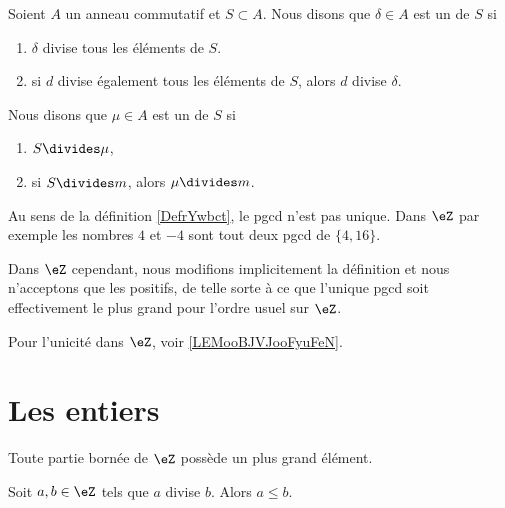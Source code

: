 \begin{definition}\label{DefrYwbct}
    Soient \( A\) un anneau commutatif et \( S\subset A\). Nous disons que \( \delta\in A\) est un  de \( S\) si
    \begin{enumerate}
        \item
            \( \delta\) divise tous les éléments de \( S\).
        \item
            si \( d\) divise également tous les éléments de \( S\), alors \( d\) divise \( \delta\).
    \end{enumerate}
    Nous disons que \( \mu\in A\) est un  de \( S\) si
    \begin{enumerate}
        \item
            \( S\divides \mu\),
        \item
            si \( S\divides m\), alors \( \mu\divides m\).
    \end{enumerate}
\end{definition}

\begin{remark}
    Au sens de la définition \ref{DefrYwbct}, le pgcd n'est pas unique. Dans \( \eZ\) par exemple les nombres \( 4\) et \( -4\) sont tout deux pgcd de \( \{4,16  \}\).

    Dans \( \eZ\) cependant, nous modifions implicitement la définition et nous n'acceptons que les positifs, de telle sorte à ce que l'unique pgcd soit effectivement le plus grand pour l'ordre usuel sur \( \eZ\).

    Pour l'unicité dans \( \eZ\), voir \ref{LEMooBJVJooFyuFeN}.
\end{remark}

\section{Les entiers}

\begin{lemma}       \label{LEMooMYEIooNFwNVI}
    Toute partie bornée de \( \eZ\) possède un plus grand élément.
\end{lemma}

\begin{proposition}     \label{PROPooYJBMooZrzkNX}
    Soit \( a,b\in \eZ\) tels que \( a\) divise \( b\). Alors \( a\leq b\).
\end{proposition}

